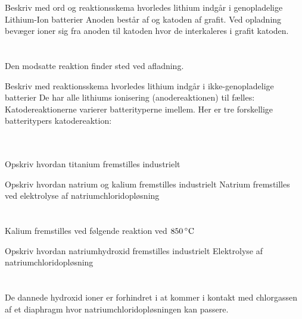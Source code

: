 \begin{flashcard}[Anvendelse]{Beskriv med ord og reaktionsskema hvorledes lithium indgår i genopladelige Lithium-Ion batterier}
Anoden består af  og katoden af grafit. Ved opladning bevæger  ioner sig fra anoden til katoden hvor de interkaleres i grafit katoden.\\ \vspace{7pt}
 \\
 \\ \vspace{7pt}
Den modsatte reaktion finder sted ved afladning.
\end{flashcard}

\begin{flashcard}[Anvendelse]{Beskriv med reaktionsskema hvorledes lithium indgår i ikke-genopladelige batterier}
De har alle lithiums ionisering (anodereaktionen) til fælles: \\ \vspace{7pt}
Katodereaktionerne varierer batterityperne imellem. Her er tre forskellige batteritypers katodereaktion: \\
 \\
 \\
\end{flashcard}

\begin{flashcard}[Fremstilling]{Opskriv hvordan titanium fremstilles industrielt}
\end{flashcard}

\begin{flashcard}[Fremstilling]{Opskriv hvordan natrium og kalium fremstilles industrielt}
Natrium fremstilles ved elektrolyse af natriumchloridopløsning \\ \vspace{7pt}
 \\
 \\ \vspace{7pt}
Kalium fremstilles ved følgende reaktion ved $850\,^{\circ}{\rm C}$ \\
\end{flashcard}

\begin{flashcard}[Fremstilling]{Opskriv hvordan natriumhydroxid fremstilles industrielt}
Elektrolyse af natriumchloridopløsning \\ \vspace{7pt}
 \\
 \\ \vspace{7pt}
De dannede hydroxid ioner er forhindret i at kommer i kontakt med chlorgassen af et diaphragm hvor natriumchloridopløsningen kan passere.
\end{flashcard}

